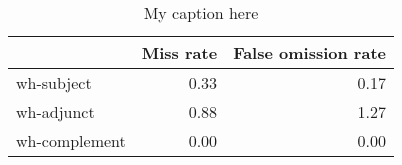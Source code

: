 \begin{table}[!ht]
\centering
\begin{tabular}{lrr}
\toprule
{} &  Miss rate &  False omission rate \\
\midrule
wh-subject    &       0.33 &                 0.17 \\
wh-adjunct    &       0.88 &                 1.27 \\
wh-complement &       0.00 &                 0.00 \\
\bottomrule
\end{tabular}
\caption{My caption here}
\label{tab:WH-ocd-combined-errors}
\end{table}